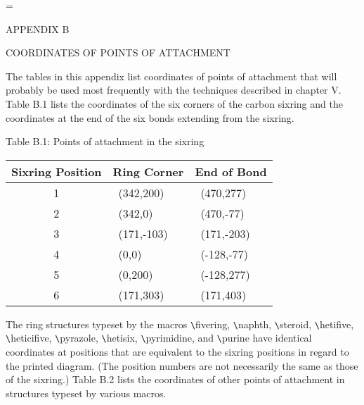 
  \nofiles                          
  \def\LATEX{\LaTeX}
  \let\TEX = \TeX               
  \setcounter{totalnumber}{5}   
  \setcounter{topnumber}{3}     
  \setcounter{bottomnumber}{3}
  \setlength{\oddsidemargin}{3.9cm}     %
  \setlength{\textwidth}{5.7in}         %
  \setlength{\topmargin}{1cm}
  \setlength{\headheight}{.6cm}
  \setlength{\textheight}{8.5in}
  \setlength{\parindent}{1cm}
  \renewcommand{\baselinestretch}{1.5}
  \raggedbottom
  
      
  \setcounter{page}{118}
  =\tenrm
 
 \centerline{APPENDIX B}
 \vspace{4mm}
 \centerline{COORDINATES OF POINTS OF ATTACHMENT}
 \vspace{4mm}
 
 The tables in this appendix list coordinates of points of
 attachment that will probably be used most frequently
 with the techniques described in chapter V.
  Table B.1 lists the coordinates of the six corners
 of the carbon sixring and the coordinates at the end of the six
 bonds extending from the sixring.
   
 \vspace{2mm}
 \centerline{Table B.1: Points of attachment in the sixring}
 \vspace{3mm}
 \hspace{1.8cm}
 \begin{minipage}{10cm}
 \begin{tabular}{|c|l|l|}
  \hline
  Sixring Position & Ring Corner & End of Bond \\
  \hline
  1                & \ (342,200)   & \ (470,277)   \\[-2mm]
  2                & \ (342,0)     & \ (470,-77)   \\[-2mm]
  3                & \ (171,-103)  & \ (171,-203)  \\[-2mm]
  4                & \ (0,0)       & \ (-128,-77)  \\[-2mm]
  5                & \ (0,200)     & \ (-128,277)  \\[-2mm]
  6                & \ (171,303)   & \ (171,403)   \\
  \hline
 \end{tabular}
\end{minipage}
     
 \vspace{4mm}
 The ring structures typeset by the macros 
 \verb+\+fivering, 
 \verb+\+naphth, 
 \verb+\+steroid, 
 \verb+\+hetifive, 
 \verb+\+heticifive, 
 \verb+\+pyrazole, 
 \verb+\+hetisix, 
 \verb+\+pyrimidine, and
 \verb+\+purine have identical coordinates at positions that are
 equivalent to the sixring positions in regard to the printed
 diagram. (The position numbers are not necessarily the same
 as those of the sixring.)
  \newpage
 Table B.2 lists the coordinates of other points of attachment
 in structures typeset by various macros.
       
